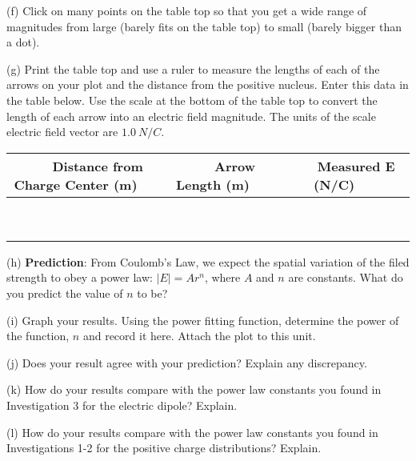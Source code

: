 (f) Click on many points on the table top so that you get a wide range of magnitudes from large
(barely fits on the table top) to small (barely bigger than a dot).

(g) Print the table top and use a ruler to measure the lengths of each of the arrows
on your plot and the distance from the positive nucleus. 
Enter this data in the table below.
Use the scale at the bottom of the table top to convert the length of each arrow into 
an electric field magnitude.
The units of the scale electric field vector are $1.0 ~ N/C$.

\vspace{0.3cm}
{\centering \begin{tabular}{|c|c|c|}
\hline 
~~~Distance from Charge Center (m)~~~&
~~~Arrow Length (m)~~~&
~~~Measured E (N/C)~~~\\
\hline
\hline 
&
&
\\
\hline 
&
&
\\
\hline 
&
&
\\
\hline 
&
&
\\
\hline 
&
&
\\
\hline 
&
&
\\
\hline 
&
&
\\
\hline 
&
&
\\
\hline 
&
&
\\
\hline
\end{tabular}\par}
\vspace{0.3cm}


(h) \textbf{Prediction}: From Coulomb's Law, we expect the spatial variation
of the filed strength to obey a power law: \( \left| E\right| =Ar^{n} \),
where \( A \) and \( n \) are constants. What do you predict the
value of \( n \) to be?\vspace{15mm}

(i) Graph your results. Using the power fitting
function, determine the power of the function, $n$ and record it here.
Attach the plot to this unit.
\vspace{15mm}

(j) Does your result agree with your prediction? Explain any discrepancy.\vspace{15mm}

(k) How do your results compare with the power law constants you found
in Investigation 3 for the electric dipole? Explain.\vspace{15mm}

(l) How do your results compare with the power law constants you found
in Investigations 1-2 for the positive charge distributions? Explain.\vspace{15mm}


